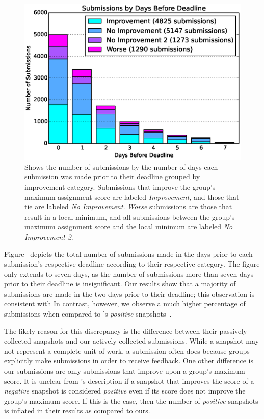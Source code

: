 \begin{figure}[!t]
\centering \includegraphics[width=5.25in]{graphs/Submissions_by_Days_Before_Deadline.eps}
\caption{Shows the number of submissions by the number of days each submission
  was made prior to their deadline grouped by improvement category.
  Submissions that improve the group's maximum assignment score are labeled
  \emph{Improvement}, and those that tie are labeled \emph{No
    Improvement}. \emph{Worse} submissions are those that result in a local
  minimum, and all submissions between the group's maximum assignment score and
  the local minimum are labeled \emph{No Improvement 2}.}
\end{figure}

Figure~ depicts the total number of submissions
made in the days prior to each submission's respective deadline according to
their respective category. The figure only extends to seven days, as the number
of submissions more than seven days prior to their deadline is
insignificant. Our results show that a majority of submissions are made in the
two days prior to their deadline; this observation is consistent with
\spacco[.]{} In contrast, however, we observe a much higher percentage of
\imp{} submissions when compared to \spacco{}'s \emph{positive}
snapshots~\cite{Spacco:2013:TIP:2462476.2465594}.

The likely reason for this discrepancy is the difference between their
passively collected snapshots and our actively collected submissions. While a
snapshot may not represent a complete unit of work, a submission often does
because groups explicitly make submissions in order to receive feedback. One
other difference is our \imp{} submissions are only submissions that improve
upon a group's maximum score. It is unclear from \spacco{}'s description if a
snapshot that improves the score of a \emph{negative} snapshot is considered
\emph{positive} even if its score does not improve the group's maximum
score. If this is the case, then the number of \emph{positive} snapshots is
inflated in their results as compared to ours.

